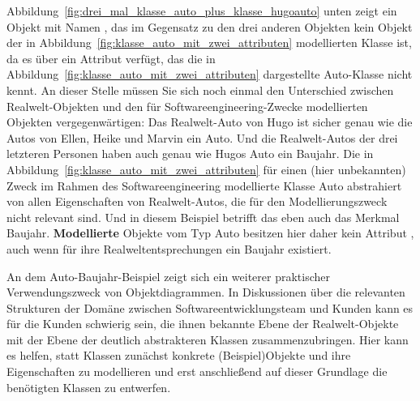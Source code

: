 Abbildung~\ref{fig:drei_mal_klasse_auto_plus_klasse_hugoauto} unten
zeigt ein Objekt mit Namen , das im Gegensatz zu den drei anderen Objekten kein Objekt der in Abbildung~\ref{fig:klasse_auto_mit_zwei_attributen} modellierten Klasse  ist, da es über ein Attribut  verfügt, das die in Abbildung~\ref{fig:klasse_auto_mit_zwei_attributen} dargestellte Auto-Klasse nicht kennt. An dieser Stelle müssen Sie sich noch einmal den Unterschied zwischen Realwelt-Objekten und den für Softwareengineering-Zwecke modellierten Objekten vergegenwärtigen: Das Realwelt-Auto von Hugo ist sicher genau wie die Autos von Ellen, Heike und Marvin ein Auto. Und die Realwelt-Autos der drei letzteren Personen haben auch genau wie Hugos Auto ein Baujahr. Die in Abbildung~\ref{fig:klasse_auto_mit_zwei_attributen} für einen (hier unbekannten) Zweck im Rahmen des Softwareengineering modellierte Klasse Auto abstrahiert von allen Eigenschaften von Realwelt-Autos, die für den Modellierungszweck nicht relevant sind. Und in diesem Beispiel betrifft das eben auch das Merkmal Baujahr. \textbf{Modellierte} Objekte vom Typ Auto besitzen hier daher kein Attribut , auch wenn für ihre Realweltentsprechungen ein Baujahr existiert.

An dem Auto-Baujahr-Beispiel zeigt sich ein weiterer praktischer Verwendungszweck von Objektdiagrammen. In  Diskussionen über die relevanten Strukturen der Domäne zwischen Softwareentwicklungsteam und Kunden kann es für die Kunden schwierig sein, die ihnen bekannte Ebene der Realwelt-Objekte mit der Ebene der deutlich abstrakteren Klassen zusammenzubringen. Hier kann es helfen, statt Klassen zunächst konkrete (Beispiel)Objekte und ihre Eigenschaften zu modellieren und erst anschließend auf dieser Grundlage die benötigten Klassen zu entwerfen.